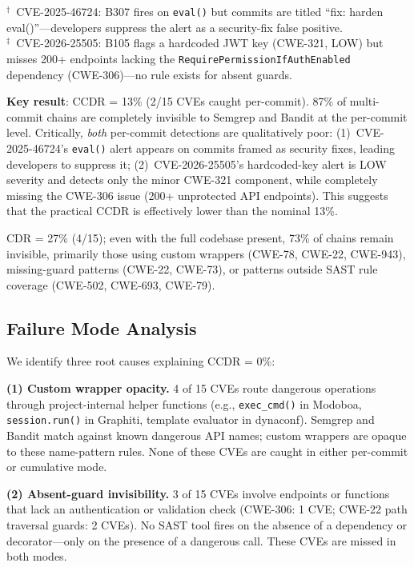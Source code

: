 \documentclass[sigconf,review]{acmart}
\newcommand{\NUMCVES}{15}
\newcommand{\CCDR}{13\%}                %
\newcommand{\CDR}{27\%}                 %
\newcommand{\CDRFAIL}{73\%}            %
\begin{document}
\noindent\begin{footnotesize}
$^\dagger$~CVE-2025-46724: B307 fires on \texttt{eval()} but commits are titled
``fix: harden eval()''---developers suppress the alert as a security-fix false positive.\\
$^\ddagger$~CVE-2026-25505: B105 flags a hardcoded JWT key (CWE-321, LOW) but misses
200+ endpoints lacking the \texttt{Require\-Permission\-If\-Auth\-Enabled} dependency
(CWE-306)---no rule exists for absent guards.
\end{footnotesize}

\textbf{Key result}: CCDR = \CCDR{} (2/\NUMCVES{} CVEs caught per-commit).
87\% of multi-commit chains are completely invisible to Semgrep and Bandit at the per-commit level.
Critically, \emph{both} per-commit detections are qualitatively poor:
(1)~CVE-2025-46724's \texttt{eval()} alert appears on commits framed as security fixes,
leading developers to suppress it;
(2)~CVE-2026-25505's hardcoded-key alert is LOW severity and detects only the minor
CWE-321 component, while completely missing the CWE-306 issue (200+ unprotected API endpoints).
This suggests that the practical CCDR is effectively lower than the nominal 13\%.

CDR = \CDR{} (4/\NUMCVES{}); even with the full codebase present, \CDRFAIL{} of chains
remain invisible, primarily those using custom wrappers (CWE-78, CWE-22, CWE-943),
missing-guard patterns (CWE-22, CWE-73), or patterns outside SAST rule coverage (CWE-502, CWE-693, CWE-79).

\subsection{Failure Mode Analysis}

We identify three root causes explaining CCDR = 0\%:

\textbf{(1) Custom wrapper opacity.} 4 of \NUMCVES{} CVEs route dangerous operations through
project-internal helper functions (e.g., \texttt{exec\_cmd()} in Modoboa, \texttt{session.run()}
in Graphiti, template evaluator in dynaconf). Semgrep and Bandit match against
known dangerous API names; custom wrappers are opaque to these name-pattern rules.
None of these CVEs are caught in either per-commit or cumulative mode.

\textbf{(2) Absent-guard invisibility.} 3 of \NUMCVES{} CVEs involve endpoints or functions
that lack an authentication or validation check (CWE-306: 1 CVE; CWE-22 path traversal
guards: 2 CVEs). No SAST tool fires on the absence of a dependency or decorator—only
on the presence of a dangerous call. These CVEs are missed in both modes.
\end{document}
